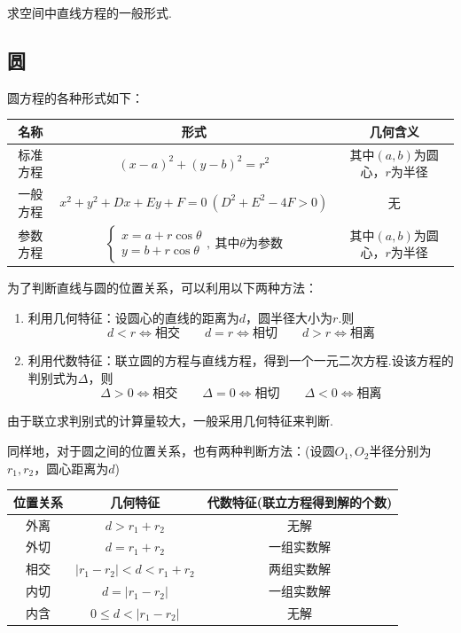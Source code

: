 \documentclass[lang=cn, zihao=5]{elegantbook}
\begin{document}
\begin{problem}
	求空间中直线方程的一般形式.
\end{problem}

\subsection{圆}

圆方程的各种形式如下：

\begin{table}[h]
	\centering
	\renewcommand\arraystretch{1.5}
	\begin{tabular}{ccc}
		\toprule
		名称&形式&几何含义 \\
		\midrule
		标准方程 & $(x-a)^2+(y-b)^2=r^2$ & 其中$(a,b)$为圆心，$r$为半径 \\
		一般方程 & $x^2+y^2+Dx+Ey+F=0~(D^2+E^2-4F>0)$ & 无 \\
		参数方程 & $\begin{cases}
			x=a+r\cos \theta \\
			y=b+r\cos \theta
		\end{cases}, ~\textit{其中}\theta \textit{为参数}$ & 其中$(a,b)$为圆心，$r$为半径 \\
		\bottomrule
	\end{tabular}
\end{table}

为了判断直线与圆的位置关系，可以利用以下两种方法：

\begin{enumerate}
	\item 利用几何特征：设圆心的直线的距离为$d$，圆半径大小为$r$.则$$d<r \Longleftrightarrow \textit{相交} \qquad d=r \Longleftrightarrow \textit{相切} \qquad d>r \Longleftrightarrow \textit{相离}$$
	\item 利用代数特征：联立圆的方程与直线方程，得到一个一元二次方程.设该方程的判别式为$\Delta$，则$$\Delta > 0 \Longleftrightarrow \textit{相交} \qquad \Delta = 0 \Longleftrightarrow \textit{相切} \qquad \Delta < 0 \Longleftrightarrow \textit{相离}$$
\end{enumerate}

由于联立求判别式的计算量较大，一般采用几何特征来判断.

同样地，对于圆之间的位置关系，也有两种判断方法：(设圆$O_1,O_2$半径分别为$r_1,r_2$，圆心距离为$d$)

\begin{table}[h]
	\centering
	\renewcommand\arraystretch{1.5}
	\begin{tabular}{c|cc}
		\toprule
		位置关系&几何特征&代数特征(联立方程得到解的个数) \\
		\midrule
		外离 & $d>r_1+r_2$ & 无解 \\
		外切 & $d=r_1+r_2$ & 一组实数解 \\
		相交 & $|r_1-r_2|<d<r_1+r_2$ & 两组实数解 \\
		内切 & $d=|r_1-r_2|$ & 一组实数解 \\
		内含 & $0 \leq d < |r_1-r_2|$ & 无解 \\
		\bottomrule
	\end{tabular}
\end{table}
\end{document}
